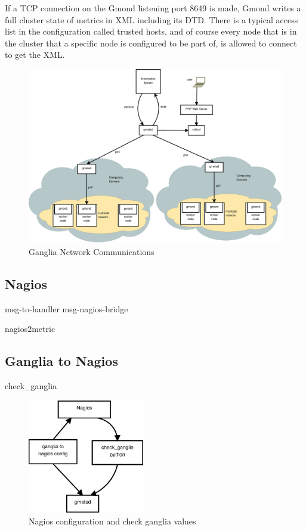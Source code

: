 If a TCP connection on the Gmond listening port 8649 is made, Gmond writes a full cluster state of metrics in XML including its DTD. There is a typical access list in the configuration called trusted hosts, and of course every node that is in the cluster that a specific node is configured to be part of, is allowed to connect to get the XML.

\begin{figure}[htb]
\centering
 \includegraphics[width=6in]{images/ganglia_data_flow.eps}
\caption{Ganglia Network Communications}
\label{figure:ganglia_network}
\end{figure}
\newpage

\subsection{Nagios}
msg-to-handler msg-nagios-bridge
\newpage

nagios2metric
\newpage

\subsection{Ganglia to Nagios}
check\_ganglia
\begin{figure}[htb]
\centering
 \includegraphics[width=2in]{images/nagios_check_ganglia.eps}
\caption{Nagios configuration and check ganglia values}
\label{figure:nagios_ganglia}
\end{figure}
\newpage

